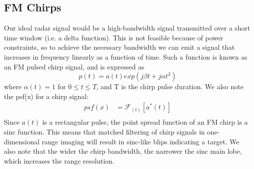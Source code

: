 \documentclass{article}
\begin{document}
\subsection*{FM Chirps}
\indent \indent
Our ideal radar signal would be a high-bandwidth signal transmitted over a short time window (i.e. a delta function). This is not feasible because of power constraints, so to achieve the necessary bandwidth we can emit a signal that increases in frequency linearly as a function of time. Such a function is known as an FM pulsed chirp signal, and is expressed as
\begin{displaymath}
	p(t) = a(t) exp(j \beta t + j \alpha t^2 )
\end{displaymath}
where \( \alpha(t) =1 \) for \( 0 \leq t \leq T \), and T is the chirp pulse duration. We also note the psf(x) for a chirp signal:
\begin{align*}
	psf(x) &= \mathcal{F}_{(t)} [a^{*}(t) ] \\
\end{align*}
Since \( a(t) \) is a rectangular pulse, the point spread function of an FM chirp is a sinc function. This means that matched filtering of chirp signals in one-dimensional range imaging will result in sinc-like blips indicating a target. We also note that the wider the chirp bandwidth, the narrower the sinc main lobe, which increases the range resolution.
\end{document}
